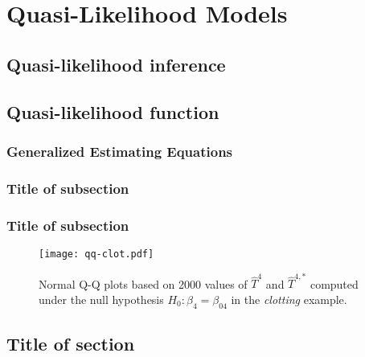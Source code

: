 \chapter{Quasi-Likelihood Models}

\fancyhead[RO,LE]{\thepage}

\setlength{\parskip}{0.5pt}

\bigskip

\section{Quasi-likelihood inference} 
\noindent

\section{Quasi-likelihood function}
\noindent

\subsection{Generalized Estimating Equations}
\noindent


\subsection{Title of subsection}
\noindent


\subsection{Title of subsection}
\noindent

\begin{figure}[!h]\centering
	\texttt{[image: qq-clot.pdf]}
	
	\caption{\label{qq-clot}Normal Q-Q plots based on 2000 values of $\widehat{T}^4$ and $\widehat{T}^{4,*}$ computed under the null hypothesis $H_0\!:\beta_4=\beta_{04}$ in the \emph{clotting} example.}
\end{figure}

\section{Title of section}
\noindent
